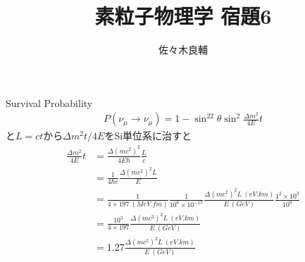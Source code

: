 \documentclass[uplatex,a4j,11pt,dvipdfmx]{jsarticle}
\begin{document}
\title{素粒子物理学 宿題6}
\author{佐々木良輔}
\date{}
\maketitle
Survival Probability
\begin{align*}
  P(\nu_\mu\rightarrow\nu_\mu)=1-\sin^22\theta\sin^2\frac{\Delta m^2}{4E}t
\end{align*}
と$L=ct$から$\Delta m^2t/4E$をSi単位系に治すと
\begin{align*}
  \frac{\Delta m^2}{4E}t&=\frac{\Delta (mc^2)^2}{4E\hbar}\frac{L}{c}\\
  &=\frac{1}{4\hbar c}\frac{\Delta(mc^2)^2L}{E}\\
  &=\frac{1}{4\times 197\ (\si{MeV.fm})}\frac{1}{10^6\times10^{-15}}\frac{\Delta(mc^2)^2L\ (\si{eV.km})}{E\ (\si{GeV})}\frac{1^2\times 10^3}{10^9}\\
  &=\frac{10^3}{4\times197}\frac{\Delta(mc^2)^2L\ (\si{eV.km})}{E\ (\si{GeV})}\\
  &=1.27\frac{\Delta(mc^2)^2L\ (\si{eV.km})}{E\ (\si{GeV})}
\end{align*}
\end{document}
